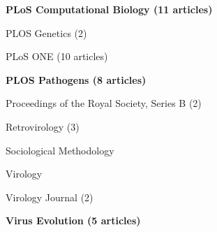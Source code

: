 \documentclass[11pt]{moderncv}
\begin{document}
{\begin{cvitemize}
\item \textbf{PLoS Computational Biology     (11 articles)}
\item PLOS Genetics                                 (2)
\item PLoS ONE                                      (10 articles)
\item \textbf{PLOS Pathogens         (8 articles)}
\item Proceedings of the Royal Society, Series B    (2)
\item Retrovirology                                 (3)
\item Sociological Methodology                      
\item Virology                                      
\item Virology Journal                              (2)
\item \textbf{Virus Evolution           (5 articles)}
\end{cvitemize}
}
\end{document}
